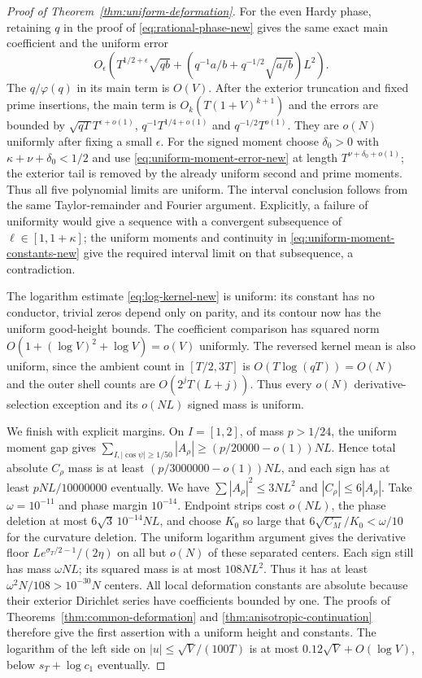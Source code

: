 \begin{proof}[Proof of Theorem~\ref{thm:uniform-deformation}]
For the even Hardy phase, retaining $q$ in the proof of
\eqref{eq:rational-phase-new} gives the same exact main coefficient
and the uniform error
\[
 O_\epsilon\left(T^{1/2+\epsilon}\sqrt{qb}
          +(q^{-1}a/b+q^{-1/2}\sqrt{a/b})L^2\right).
\]
The $q/\varphi(q)$ in its main term is $O(V)$.
After the exterior truncation and fixed prime insertions, the
main term is $O_k(T(1+V)^{k+1})$ and the errors are bounded by
$\sqrt{qT}T^{\epsilon+o(1)}$, $q^{-1}T^{1/4+o(1)}$ and
$q^{-1/2}T^{o(1)}$. They are $o(N)$ uniformly after fixing a small
$\epsilon$. For the signed moment choose
$\delta_0>0$ with $\kappa+\nu+\delta_0<1/2$ and use
\eqref{eq:uniform-moment-error-new} at length
$T^{\nu+\delta_0+o(1)}$; the exterior tail is removed by the
already uniform second and prime moments. Thus all five polynomial
limits are uniform. The interval conclusion follows from the same
Taylor-remainder and Fourier argument. Explicitly, a failure of
uniformity would give a sequence with a convergent subsequence of
$\ell\in[1,1+\kappa]$; the uniform moments and continuity in
\eqref{eq:uniform-moment-constants-new} give the required interval
limit on that subsequence, a contradiction.

The logarithm estimate \eqref{eq:log-kernel-new} is uniform: its
constant has no conductor, trivial zeros depend only on parity, and
its contour now has the uniform good-height bounds.
The coefficient comparison has squared norm
$O(1+(\log V)^2+\log V)=o(V)$ uniformly.
The reversed kernel mean is also uniform, since the ambient count
in $[T/2,3T]$ is $O(T\log(qT))=O(N)$ and the outer shell counts
are $O(2^jT(L+j))$. Thus every $o(N)$ derivative-selection
exception and its $o(NL)$ signed mass is uniform.

We finish with explicit margins. On $I=[1,2]$, of mass $p>1/24$,
the uniform moment gap gives
$\sum_{I,|\cos\psi|\ge1/50}|A_\rho|\ge(p/20000-o(1))NL$.
Hence total absolute $C_\rho$ mass is at least
$(p/3000000-o(1))NL$, and each sign has at least
$pNL/10000000$ eventually. We have
$\sum|A_\rho|^2\le3NL^2$ and $|C_\rho|\le6|A_\rho|$.
Take $\omega=10^{-11}$ and phase margin $10^{-14}$.
Endpoint strips cost $o(NL)$, the phase deletion at most
$6\sqrt3\,10^{-14}NL$, and choose $K_0$ so large that
$6\sqrt{C_M}/K_0<\omega/10$ for the curvature deletion.
The uniform logarithm argument gives the derivative floor
$L e^{\sigma_T/2-1}/(2\eta)$ on all but $o(N)$ of these separated
centers. Each sign still has mass $\omega NL$; its squared mass
is at most $108NL^2$. Thus it has at least
$\omega^2N/108>10^{-30}N$ centers.
All local deformation constants are absolute because their exterior
Dirichlet series have coefficients bounded by one. The proofs of
Theorems~\ref{thm:common-deformation} and
\ref{thm:anisotropic-continuation} therefore give the first
assertion with a uniform height and constants. The logarithm of the
left side on $|u|\le\sqrt V/(100T)$ is at most
$0.12\sqrt V+O(\log V)$, below $s_T+\log c_1$ eventually.


\end{proof}
